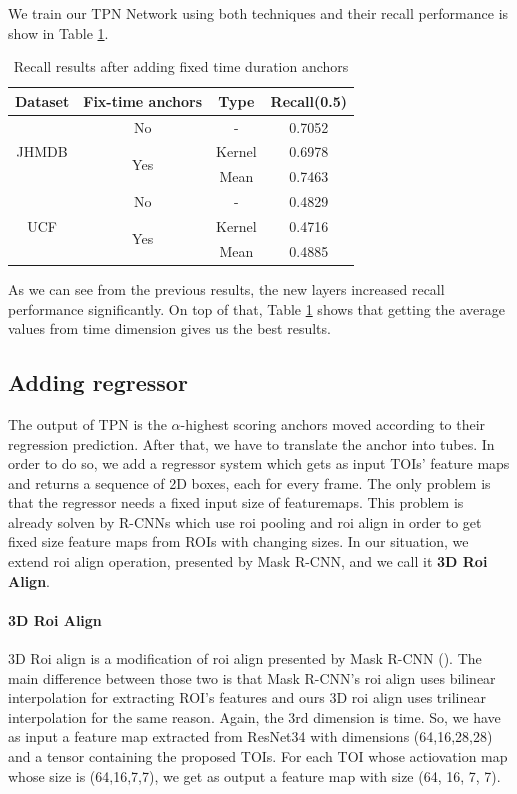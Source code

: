 We train our TPN Network using both techniques and their recall performance is show in Table \ref{table:add_16}.

\begin{table}[h]
  \centering
  \begin{tabular}{||c | c | c || c ||}
    \hline
    \textbf{Dataset} & \textbf{Fix-time anchors} & \textbf{Type} & \textbf{Recall(0.5)} \\
    \hline  \hline
    \multirow{3}{4em}{JHMDB} & No &  - & 0.7052 \\
    \cline{2-4}
    {} & \multirow{2}{*}{Yes} & Kernel & 0.6978 \\
    \cline{3-4}
    {} & {} & Mean & 0.7463 \\
    \hline
    \multirow{3}{4em}{UCF} & No & - & 0.4829 \\
    \cline{2-4}
    {} & \multirow{2}{*}{Yes} & Kernel & 0.4716 \\
    \cline{3-4}
    {} & {} & Mean & 0.4885 \\
    \hline      
  \end{tabular}
  \caption{Recall results after adding fixed time duration anchors}
  \label{table:add_16}
\end{table}

As we can see from the previous results, the new layers increased recall performance significantly. On top of that, Table \ref{table:add_16} shows that
getting the average values from time dimension gives us the best results.


\subsection{Adding regressor}
The output of TPN is the $\alpha$-highest scoring anchors moved according to their regression prediction. After that, we have to translate the anchor into tubes.
In order to do so, we add a regressor system which gets as input TOIs' feature maps and returns a sequence of 2D boxes, each for every frame.
The only problem is that the regressor needs a fixed input size of featuremaps. This problem is already solven by R-CNNs which use roi pooling and roi align
in order to get fixed size feature maps from ROIs with changing sizes. In our situation, we extend roi align operation, presented by Mask R-CNN, and we
call it \textbf{3D Roi Align}.

\paragraph{3D Roi Align}
3D Roi align is a modification of roi align presented by Mask R-CNN (\cite{DBLP:journals/corr/HeGDG17}). The main difference between those two is that Mask R-CNN's roi align uses
bilinear interpolation for extracting ROI's features and ours 3D roi align uses trilinear interpolation for the same reason. Again, the 3rd dimension is
time.
So, we have as input a feature map extracted from ResNet34 with dimensions (64,16,28,28) and a tensor containing the proposed TOIs.
For each TOI whose actiovation map whose size is (64,16,7,7), we get as output a feature map with size (64, 16, 7, 7). \par

